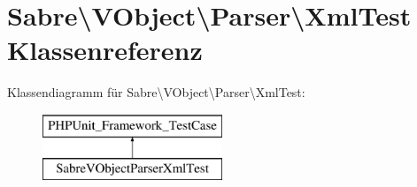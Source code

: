 \hypertarget{class_sabre_1_1_v_object_1_1_parser_1_1_xml_test}{}\section{Sabre\textbackslash{}V\+Object\textbackslash{}Parser\textbackslash{}Xml\+Test Klassenreferenz}
\label{class_sabre_1_1_v_object_1_1_parser_1_1_xml_test}
Klassendiagramm für Sabre\textbackslash{}V\+Object\textbackslash{}Parser\textbackslash{}Xml\+Test\+:\begin{figure}[H]
\begin{center}
\leavevmode
\includegraphics[height=2.000000cm]{class_sabre_1_1_v_object_1_1_parser_1_1_xml_test}
\end{center}
\end{figure}
